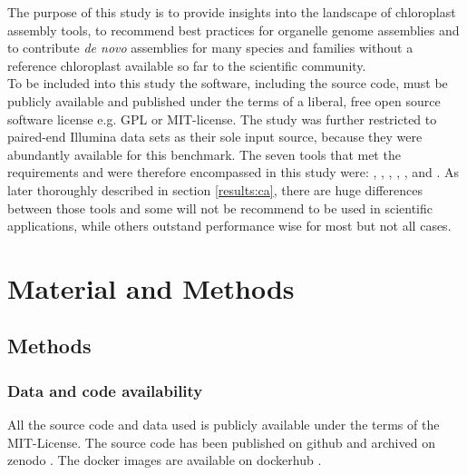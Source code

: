 The purpose of this study is to provide insights into the landscape of chloroplast assembly tools, to
recommend best practices for organelle genome assemblies and to contribute \textit{de novo} assemblies for
many species and families without a reference chloroplast available so far to the scientific community. \\ To
be included into this study the software, including the source code, must be publicly available and published
under the terms of a liberal, free open source software license e.g. GPL or MIT-license. The study was further
restricted to paired-end Illumina data sets as their sole input source, because they were abundantly available
for this benchmark. The seven tools that met the requirements and were therefore encompassed in this study
were: \ce,\hspace{0.5ex} \oa,\hspace{0.5ex} \fp,\hspace{0.5ex} \ioga,\hspace{0.5ex} \np,\hspace{0.5ex}
\go\hspace{0.5ex} and \cassp. As later thoroughly described in section \ref{results:ca}, there are huge
differences between those tools and some will not be recommend to be used in scientific applications, while
others outstand performance wise for most but not all cases.


\section{Material and Methods}
\subsection{Methods}
\subsubsection{Data and code availability}
All the source code and data used is publicly available under the terms of the MIT-License. The source code
has been published on github \cite{github-benchmark-repo} and archived on zenodo \cite{zenodorepo} . The
docker images are available on dockerhub \cite{dockerhub-benchmark}.

